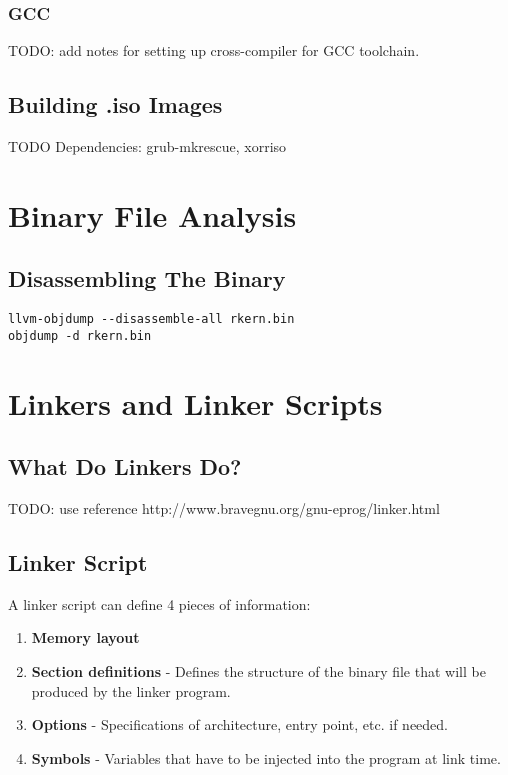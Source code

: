 \documentclass[a4paper,12pt,twoside]{report}
\begin{document}
			\subsection{GCC}
	        TODO: add notes for setting up cross-compiler for GCC toolchain.

	    \section{Building .iso Images}
	    TODO
	    Dependencies: grub-mkrescue, xorriso

    \chapter{Binary File Analysis}

        \section{Disassembling The Binary}

            \begin{verbatim}
llvm-objdump --disassemble-all rkern.bin
objdump -d rkern.bin
            \end{verbatim}

    \chapter{Linkers and Linker Scripts}

        \section{What Do Linkers Do?}
            TODO: use reference http://www.bravegnu.org/gnu-eprog/linker.html

        \section{Linker Script}
            A linker script can define 4 pieces of information:
            \begin{enumerate}
            	\item \textbf{Memory layout}
            	\item \textbf{Section definitions} - Defines the structure of the binary file that will be produced by the linker program.
            	\item \textbf{Options} - Specifications of architecture, entry point, etc. if needed.
            	\item \textbf{Symbols} - Variables that have to be injected into the program at link time.
            \end{enumerate}\cite{memfaultLinkerScripts}
\end{document}
